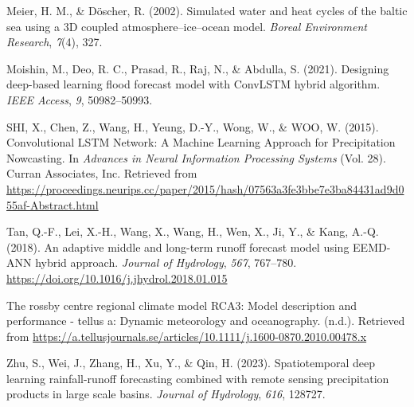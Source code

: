 \documentclass[
]{agujournal2019}
\newlength{\cslhangindent}
\newlength{\cslentryspacingunit} %
\newenvironment{CSLReferences}[2] %
 {%
  \setlength{\parindent}{0pt}
  \ifodd #1
  \let\oldpar\par
  \def\par{\hangindent=\cslhangindent\oldpar}
  \fi
  \setlength{\parskip}{#2\cslentryspacingunit}
 }%
 {}
\begin{document}
\begin{CSLReferences}{1}{0}
\leavevmode{}%
Meier, H. M., \& Döscher, R. (2002). Simulated water and heat cycles of
the baltic sea using a 3D coupled atmosphere--ice--ocean model.
\emph{Boreal Environment Research}, \emph{7}(4), 327.

\leavevmode{}%
Moishin, M., Deo, R. C., Prasad, R., Raj, N., \& Abdulla, S. (2021).
Designing deep-based learning flood forecast model with ConvLSTM hybrid
algorithm. \emph{IEEE Access}, \emph{9}, 50982--50993.

\leavevmode{}%
SHI, X., Chen, Z., Wang, H., Yeung, D.-Y., Wong, W., \& WOO, W. (2015).
Convolutional {LSTM Network}: {A Machine Learning Approach} for
{Precipitation Nowcasting}. In \emph{Advances in {Neural Information
Processing Systems}} (Vol. 28). Curran Associates, Inc. Retrieved from
\url{https://proceedings.neurips.cc/paper/2015/hash/07563a3fe3bbe7e3ba84431ad9d055af-Abstract.html}

\leavevmode{}%
Tan, Q.-F., Lei, X.-H., Wang, X., Wang, H., Wen, X., Ji, Y., \& Kang,
A.-Q. (2018). An adaptive middle and long-term runoff forecast model
using {EEMD-ANN} hybrid approach. \emph{Journal of Hydrology},
\emph{567}, 767--780.
\url{https://doi.org/10.1016/j.jhydrol.2018.01.015}

\leavevmode{}%
The rossby centre regional climate model RCA3: Model description and
performance - tellus a: Dynamic meteorology and oceanography. (n.d.).
Retrieved from
\url{https://a.tellusjournals.se/articles/10.1111/j.1600-0870.2010.00478.x}

\leavevmode{}%
Zhu, S., Wei, J., Zhang, H., Xu, Y., \& Qin, H. (2023). Spatiotemporal
deep learning rainfall-runoff forecasting combined with remote sensing
precipitation products in large scale basins. \emph{Journal of
Hydrology}, \emph{616}, 128727.

\end{CSLReferences}
\end{document}
